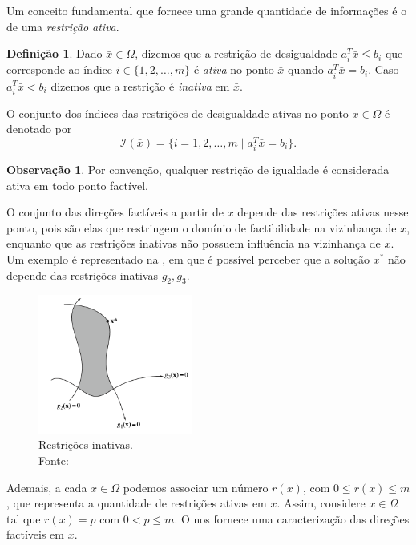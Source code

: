 \documentclass[12pt,a4paper]{scrartcl}
\def\xbar{\bar{x}}
\theoremstyle{definition}%
\newtheorem{defi}{Definição}
\newtheorem{obs}{Observação}
\begin{document}
Um conceito fundamental que fornece uma grande quantidade de informações é o de uma \emph{restrição ativa}.

\begin{defi}
Dado $\xbar \in \Omega$, dizemos que a restrição de desigualdade $a_{i}^{T}\bar{x} \leq b_{i}$ que corresponde ao índice $i\in \{ 1,2, \ldots , m\}$ é \emph{ativa} no ponto $\xbar$ quando $a_{i}^{T}\bar{x} = b_{i}$. Caso $a_{i}^{T}\bar{x} < b_{i}$ dizemos que a restrição é \emph{inativa} em $\xbar$. 
\end{defi} 
O conjunto dos índices das restrições de desigualdade ativas no ponto $\xbar \in \Omega$ é denotado por
\[
\mathcal{I} (\xbar) = \{ i = 1,2, \ldots , m \mid a_{i}^{T}\bar{x} = b_{i} \} .
\]

\begin{obs}
Por convenção, qualquer restrição de igualdade é considerada ativa em todo ponto factível.
\end{obs}

O conjunto das direções factíveis a partir de $x$ depende das restrições ativas nesse ponto, pois são elas que restringem o domínio de factibilidade na vizinhança de $x$, enquanto que as restrições inativas não possuem influência na vizinhança de $x$. Um exemplo é representado na , em que é possível perceber que a solução $x^{*}$ não depende das restrições inativas $g_{2}, g_{3}$.

\begin{figure}[!h] 
	\centering
	\includegraphics[width=0.45\textwidth]{restricoes_inativas}
	\caption{Restrições inativas. \\ Fonte: \textcite{Luenberger:2016} \label{fig:restricoes_inativas}}
\end{figure}

Ademais, a cada $x\in \Omega$ podemos associar um número $r(x)$, com $0\leq r(x) \leq m$, que representa a quantidade de restrições ativas em $x$. Assim, considere $x\in \Omega$ tal que $r(x) = p$ com $0<p \leq m$. O  nos fornece uma caracterização das direções factíveis em $x$.
\end{document}
